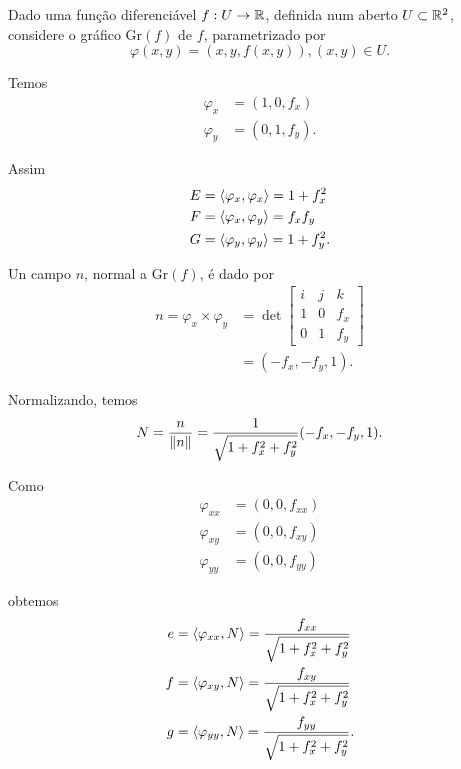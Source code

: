 \begin{exemplo}
	Dado uma função diferenciável $f: U \rightarrow \mathbb{R}$, definida num aberto $U \subset \mathbb{R}^2$, considere o gráfico $\text{Gr}(f)$ de $f$, parametrizado por
	\begin{equation*}
	\varphi(x,y) = (x,y,f(x,y)), (x,y) \in U.
	\end{equation*}
	
	Temos
	\begin{align*}
	\varphi_x &= (1,0,f_x)\\
	\varphi_y &= (0,1,f_y).
	\end{align*}
	
	Assim
	\begin{align*}
	E &= \left\langle \varphi_x,\varphi_x \right\rangle = 1 + f_x^2\\
	F &= \left\langle \varphi_x,\varphi_y \right\rangle = f_x f_y\\
	G &= \left\langle \varphi_y,\varphi_y \right\rangle = 1 + f_y^2.
	\end{align*}
	
	Un campo $n$, normal a $\text{Gr}(f)$, é dado por
	\begin{align*}
	n = \varphi_x \times \varphi_y &= \det \left[ \begin{matrix}
	i & j & k\\
	1 & 0 & f_x\\
	0 & 1 & f_y
	\end{matrix} \right]\\
	&= (-f_x, -f_y, 1).
	\end{align*}
	
	Normalizando, temos
	\begin{equation*}
	N = \frac{n}{\left\| n \right\|} = \frac{1}{\sqrt{1 + f_x^2 + f_y^2}}(-f_x, -f_y, 1).
	\end{equation*}
	
	Como
	\begin{align*}
	\varphi_{xx} &= (0, 0, f_{xx})\\
	\varphi_{xy} &= (0, 0, f_{xy})\\
	\varphi_{yy} &= (0, 0, f_{yy})
	\end{align*}
	
	obtemos
	\begin{align*}
	e &= \left\langle \varphi_{xx},N \right\rangle = \frac{f_{xx}}{\sqrt{1 + f_x^2 + f_y^2}}\\
	f &= \left\langle \varphi_{xy},N \right\rangle = \frac{f_{xy}}{\sqrt{1 + f_x^2 + f_y^2}}\\
	g &= \left\langle \varphi_{yy},N \right\rangle = \frac{f_{yy}}{\sqrt{1 + f_x^2 + f_y^2}}.
	\end{align*}
	

\end{exemplo}
